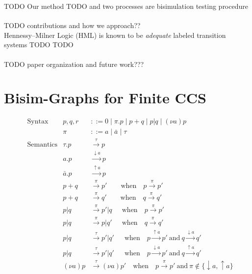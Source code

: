 \documentclass{llncs}
\begin{document}
TODO Our method TODO
and 
two processes are
bisimulation testing procedure


\paragraph{} TODO contributions and how we approach??\\
Hennessy--Milner Logic (HML) is known to be \emph{adequate}
labeled transition systems TODO TODO

\paragraph{} TODO paper organization and future work???

\section{Bisim-Graphs for Finite CCS} \label{sec:ccsbisim}

\begin{align*}
&\text{Syntax} &
p,q,r &::= 0 \mid \pi.p \mid p + q \mid p|q \mid (\nu a)p \\ &&
\pi &::= a \mid \bar{a} \mid \tau
\\
&\text{Semantics} &
\tau.p &\xrightarrow{\tau} p \\ &&
a.p &\xrightarrow{\downarrow a} p \\ &&
\bar{a}.p &\xrightarrow{\uparrow a} p \\ &&
p+q &\xrightarrow{\pi} p' \qquad\text{when}\quad p \xrightarrow{\pi} p' \\ &&
p+q &\xrightarrow{\pi} q' \qquad\text{when}\quad q \xrightarrow{\pi} q' \\ &&
p|q &\xrightarrow{\pi} p'|q ~~\quad\text{when}\quad p \xrightarrow{\pi} p' \\ &&
p|q &\xrightarrow{\pi} p|q' ~~\quad\text{when}\quad q \xrightarrow{\pi} q' \\ &&
p|q &\xrightarrow{\tau} p'|q' ~\;\quad\text{when}\quad
  p \xrightarrow{\uparrow a} p' ~\text{and}~
  q \xrightarrow{\downarrow a} q' \\ &&
p|q &\xrightarrow{\tau} p'|q' ~\;\quad\text{when}\quad
  p \xrightarrow{\downarrow a} p' ~\text{and}~
  q \xrightarrow{\uparrow a} q' \\ &&
(\nu a)p &\xrightarrow{\tau} (\nu a)p' \quad\text{when}\quad
  p \xrightarrow{\pi} p' ~\text{and}~ \pi \notin \{\downarrow a, \uparrow a\}
\end{align*}
\end{document}
